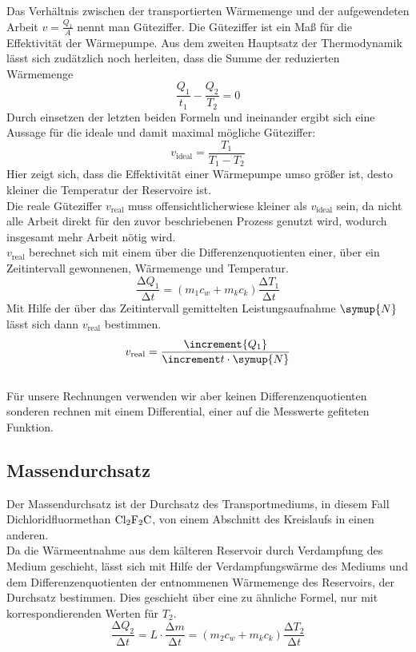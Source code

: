 Das Verhältnis zwischen der transportierten Wärmemenge und der 
aufgewendeten Arbeit $v=\frac{Q_1}{A}$ nennt man Güteziffer.
Die Güteziffer ist ein Maß für die Effektivität der Wärmepumpe.
Aus dem zweiten Hauptsatz der Thermodynamik lässt sich zudätzlich noch herleiten,
dass die Summe der reduzierten Wärmemenge 
\begin{equation}
    \frac{Q_1}{t_1}-\frac{Q_2}{T_2}=0
\end{equation}
Durch einsetzen der letzten beiden Formeln und  ineinander
ergibt sich eine Aussage für die ideale und damit maximal mögliche Güteziffer:
\begin{equation}
    v_\text{ideal}= \frac{T_1}{T_1-T_2}
    \label{eqn:videal}
\end{equation}
Hier zeigt sich, dass die Effektivität einer Wärmepumpe
umso größer ist, desto kleiner die Temperatur der Reservoire ist. \\
Die reale Güteziffer $v_\text{real}$ muss offensichtlicherwiese
kleiner als $v_\text{ideal}$ sein, da nicht alle Arbeit direkt für den zuvor 
beschriebenen Prozess genutzt wird, wodurch insgesamt mehr Arbeit nötig wird.\\
$v_\text{real}$ berechnet sich mit einem über die Differenzenquotienten
einer, über ein Zeitintervall gewonnenen, Wärmemenge und Temperatur.
\begin{equation}
    \frac{\increment Q_1}{\increment t} = \left(m_1 c_w + m_k c_k \right)\frac{\increment T_1}{\increment t}
    \label{eqn:delQ}
\end{equation}
Mit Hilfe der über das Zeitintervall gemittelten Leistungsaufnahme $\symup{N}$
lässt sich dann $v_\text{real}$ bestimmen.
\begin{equation}
    v_\text{real}= \frac{\increment{Q_1}}{\increment t \cdot \symup{N} }
    \label{eqn:vreal1}
\end{equation}\\
Für unsere Rechnungen verwenden wir aber keinen Differenzenquotienten sonderen rechnen mit einem Differential,
einer auf die Messwerte gefiteten Funktion.

\subsection{Massendurchsatz}

Der Massendurchsatz ist der Durchsatz des Transportmediums, in diesem Fall
Dichloridfluormethan $\ce{Cl2F2C}$, von einem Abschnitt des Kreislaufs in einen anderen.\\
Da die Wärmeentnahme aus dem kälteren Reservoir durch Verdampfung des Medium geschieht, 
lässt sich mit Hilfe der Verdampfungswärme des Mediums und dem Differenzenquotienten 
der entnommenen Wärmemenge des Reservoirs, der Durchsatz bestimmen.
Dies geschieht über eine zu  ähnliche Formel, nur mit korrespondierenden
Werten für $T_2$.
\begin{equation}
    \frac{\increment Q_2}{\increment t} = L\cdot \frac{\increment m}{\increment t}
    = \left(m_2 c_w + m_k c_k \right)\frac{\increment T_2}{\increment t}
\end{equation}

